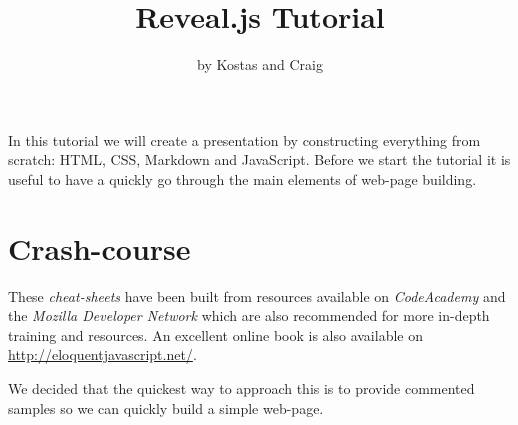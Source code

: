 \documentclass[a4paper]{article}
\begin{document}
\title{Reveal.js Tutorial}
\author{by Kostas and Craig}
\maketitle

In this tutorial we will create a presentation by constructing everything from scratch: HTML, CSS, Markdown and JavaScript.
Before we start the tutorial it is useful to have a quickly go through the main elements of web-page building.

\section{Crash-course}
These \textit{cheat-sheets} have been built from resources available on \emph{CodeAcademy} and the \emph{Mozilla Developer Network} which are also recommended for more in-depth training and resources. An excellent online book is also available on \url{http://eloquentjavascript.net/}.

We decided that the quickest way to approach this is to provide commented samples so we can quickly build a simple web-page.
\end{document}
